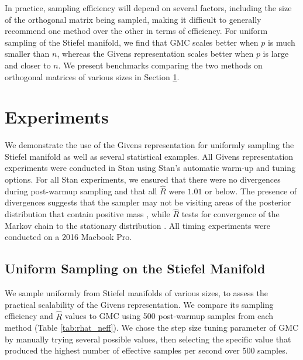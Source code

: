 \documentclass[ba]{imsart}
\numberwithin{equation}{section}
\theoremstyle{plain}
\begin{document}
\noindent In practice, sampling efficiency will depend on several factors, including the size of the orthogonal matrix being sampled, making it difficult to generally recommend one method over the other in terms of efficiency. For uniform sampling of the Stiefel manifold, we find that GMC scales better when $p$ is much smaller than $n$, whereas the Givens representation scales better when $p$ is large and closer to $n$. We present benchmarks comparing the two methods on orthogonal matrices of various sizes in Section \ref{examples}.

\section{Experiments} \label{examples}
We demonstrate the use of the Givens representation for uniformly sampling the Stiefel manifold as well as several statistical examples. All Givens representation experiments were conducted in Stan using Stan's automatic warm-up and tuning options. For all Stan experiments, we ensured that there were no divergences during post-warmup sampling and that all $\hat{R}$ were $1.01$ or below. The presence of divergences suggests that the sampler may not be visiting areas of the posterior distribution that contain positive mass \citep{betancourt2015hamiltonian}, while $\hat{R}$ tests for convergence of the Markov chain to the stationary distribution \citep{gelman1992inference}. All timing experiments were conducted on a 2016 Macbook Pro.

\subsection{Uniform Sampling on the Stiefel Manifold} \label{scaling_examples}
We sample uniformly from Stiefel manifolds of various sizes, to assess the practical scalability of the Givens representation. We compare its sampling efficiency and $\hat{R}$ values to GMC using 500 post-warmup samples from each method (Table \ref{tab:rhat_neff}).  We chose the step size tuning parameter of GMC by manually trying several possible values, then selecting the specific value that produced the highest number of effective samples per second over 500 samples.
\end{document}

